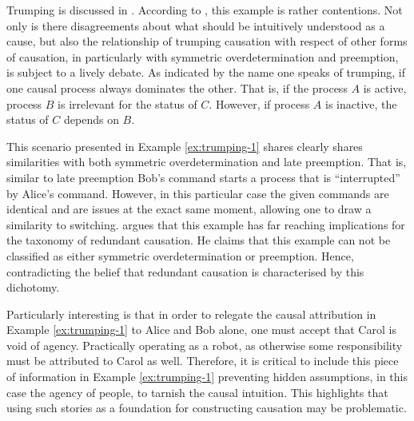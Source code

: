 \documentclass[11pt,a4paper]{book}
\theoremstyle{definition}
\theoremstyle{definition}
\theoremstyle{definition}
\theoremstyle{remark}
\begin{document}
%
%
%

Trumping is discussed in \parencite{halpern2011actual,weslake2015partial}.
According to \parencite{weslake2015partial}, this example is rather contentions. 
Not only is there disagreements about what should be intuitively understood as a cause,
but also the relationship of trumping causation with respect of other forms of causation, in particularly with symmetric overdetermination and preemption, is subject to a lively debate.
As indicated by the name one speaks of trumping, if one causal process always dominates the other. 
That is, if the process $A$ is active, process $B$ is irrelevant for the status of $C$.
However, if process $A$ is inactive, the status of $C$ depends on $B$.

This scenario presented in Example \ref{ex:trumping-1} shares clearly shares similarities with both symmetric overdetermination and late preemption. 
That is, similar to late preemption Bob's command starts a process that is ``interrupted'' by Alice's command.
However, in this particular case the given commands are identical and are issues at the exact same moment, allowing one to draw a similarity to switching.
\parencite{hitchcock2011trumping} argues that this example has  far reaching implications for the taxonomy of redundant causation. 
He claims that this example can not be classified as either symmetric overdetermination or preemption. 
Hence, contradicting the belief that redundant causation is characterised by this dichotomy. 

Particularly interesting is that in order to relegate the causal attribution in Example \ref{ex:trumping-1} to Alice and Bob alone, one must accept that Carol is void of agency.
Practically operating as a robot, as otherwise some responsibility must be attributed to Carol as well. Therefore, it is critical to include this piece of information in Example \ref{ex:trumping-1} preventing hidden 
assumptions, in this case the agency of people, to tarnish the causal intuition.
This highlights that using such stories as a foundation for constructing causation may be problematic.
\end{document}
